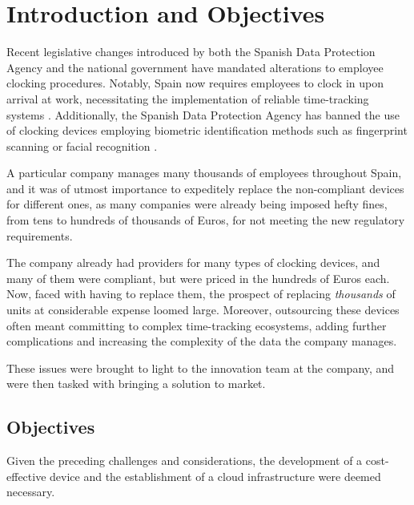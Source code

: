 \setcounter{chapter}{0}
\chapter{Introduction and Objectives}
\label{cap:introduction}


Recent legislative changes introduced by both the Spanish Data Protection Agency and the national government 
have mandated alterations to employee clocking procedures. Notably, Spain now requires employees to clock in 
upon arrival at work, necessitating the implementation of reliable time-tracking systems 
\cite{boe_obligacionfichajes}. Additionally, the Spanish Data Protection Agency has banned the use of clocking 
devices employing biometric identification methods such as fingerprint scanning or facial recognition 
\cite{aepd_prohibicionbiometricos}.

A particular company manages many thousands of employees throughout Spain, and it was of utmost importance
to expeditely replace the non-compliant devices for different ones, as many companies were already being
imposed hefty fines, from tens to hundreds of thousands of Euros, for not meeting the new regulatory 
requirements.

The company already had providers for many types of clocking devices, and many of them were compliant, but 
were priced in the hundreds of Euros each. Now, faced with having to replace them, the prospect of replacing 
\textit{thousands} of units at considerable expense loomed large.  Moreover, outsourcing these devices often 
meant committing to complex time-tracking ecosystems, adding further complications and increasing the
complexity of the data the company manages.

These issues were brought to light to the innovation team at the company, and were then tasked with bringing 
a solution to market.

\section{Objectives}

Given the preceding challenges and considerations, the development of a cost-effective device and the establishment 
of a cloud infrastructure were deemed necessary.


